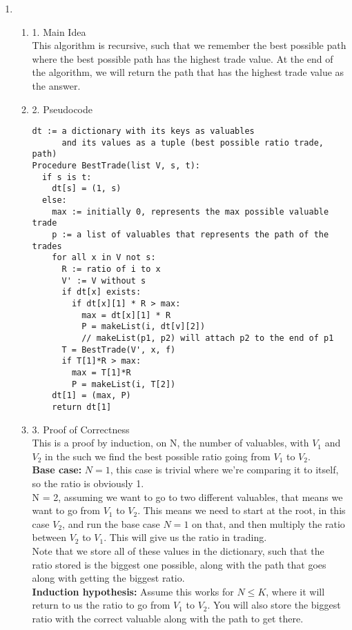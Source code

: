 \documentclass[11pt]{article}
\newenvironment{qparts}{\begin{enumerate}[{(}a{)}]}{\end{enumerate}}
\begin{document}
\begin{qparts}
\item 
\begin{qparts}
\item[1.] Main Idea \\
This algorithm is recursive, such that we remember the best possible path where the best possible path has the highest trade value. At the end of the algorithm, we will return the path that has the highest trade value as the answer.
\item[2.] Pseudocode 
\begin{verbatim}
dt := a dictionary with its keys as valuables
      and its values as a tuple (best possible ratio trade, path)
Procedure BestTrade(list V, s, t):
  if s is t:
    dt[s] = (1, s)
  else:
    max := initially 0, represents the max possible valuable trade
    p := a list of valuables that represents the path of the trades
    for all x in V not s:
      R := ratio of i to x
      V' := V without s
      if dt[x] exists:
        if dt[x][1] * R > max:
          max = dt[x][1] * R 
          P = makeList(i, dt[v][2])
          // makeList(p1, p2) will attach p2 to the end of p1
      T = BestTrade(V', x, f)
      if T[1]*R > max:
        max = T[1]*R
        P = makeList(i, T[2])
    dt[1] = (max, P)
    return dt[1]
\end{verbatim}
\item[3.] Proof of Correctness \\
This is a proof by induction, on N, the number of valuables, with $V_1$ and $V_2$ in the such we find the best possible ratio going from $V_1$ to $V_2$. \\
\textbf{Base case:} $N = 1$, this case is trivial where we're comparing it to itself, so the ratio is obviously 1. \\
N = 2, assuming we want to go to two different valuables, that means we want to go from $V_1$ to $V_2$. This means we need to start at the root, in this case $V_2$, and run the base case $N = 1$ on that, and then multiply the ratio between $V_2$ to $V_1$. This will give us the ratio in trading. \\
Note that we store all of these values in the dictionary, such that the ratio stored is the biggest one possible, along with the path that goes along with getting the biggest ratio. \\
\textbf{Induction hypothesis:} Assume this works for $N \leq K$, where it will return to us the ratio to go from $V_1$ to $V_2$. You will also store the biggest ratio with the correct valuable along with the path to get there. \\ 

\end{qparts}
\end{qparts}
\end{document}
